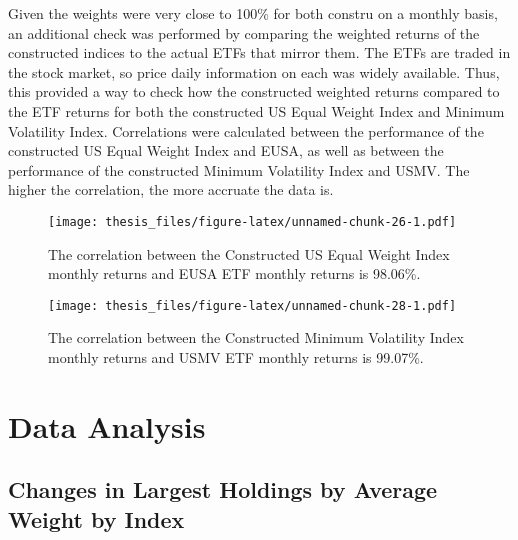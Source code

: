 \documentclass[12pt,twoside]{reedthesis}
\theoremstyle{definition}
\theoremstyle{definition}
\theoremstyle{definition}
\theoremstyle{remark}
\begin{document}
Given the weights were very close to 100\% for both constru on a monthly
basis, an additional check was performed by comparing the weighted
returns of the constructed indices to the actual ETFs that mirror them.
The ETFs are traded in the stock market, so price daily information on
each was widely available. Thus, this provided a way to check how the
constructed weighted returns compared to the ETF returns for both the
constructed US Equal Weight Index and Minimum Volatility Index.
Correlations were calculated between the performance of the constructed
US Equal Weight Index and EUSA, as well as between the performance of
the constructed Minimum Volatility Index and USMV. The higher the
correlation, the more accruate the data is.
\begin{figure}[htbp]
\centering
\texttt{[image: thesis\_files/figure-latex/unnamed-chunk-26-1.pdf]}
\caption{\label{fig:unnamed-chunk-26}The correlation between the Constructed
US Equal Weight Index monthly returns and EUSA ETF monthly returns is
98.06\%.}
\end{figure}
\begin{figure}[htbp]
\centering
\texttt{[image: thesis\_files/figure-latex/unnamed-chunk-28-1.pdf]}
\caption{\label{fig:unnamed-chunk-28}The correlation between the Constructed
Minimum Volatility Index monthly returns and USMV ETF monthly returns is
99.07\%.}
\end{figure}
\chapter{Data Analysis}\label{data-analysis}

\section{Changes in Largest Holdings by Average Weight by
Index}\label{changes-in-largest-holdings-by-average-weight-by-index}
\end{document}
